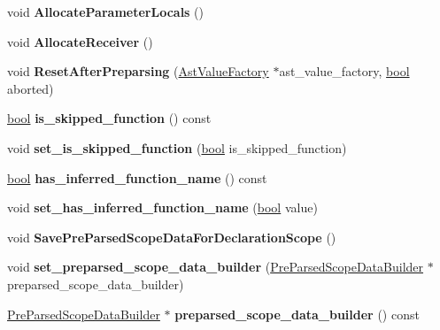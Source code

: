 \begin{DoxyCompactItemize}
void {\bfseries Allocate\+Parameter\+Locals} ()
\item 
\mbox{\label{classv8_1_1internal_1_1DeclarationScope_afe99b27f611544354653c5275d39ed03}} 
void {\bfseries Allocate\+Receiver} ()
\item 
\mbox{\label{classv8_1_1internal_1_1DeclarationScope_a00cec2e44e66ea9705e56ba435012943}} 
void {\bfseries Reset\+After\+Preparsing} (\mbox{\hyperlink{classv8_1_1internal_1_1AstValueFactory}{Ast\+Value\+Factory}} $\ast$ast\+\_\+value\+\_\+factory, \mbox{\hyperlink{classbool}{bool}} aborted)
\item 
\mbox{\label{classv8_1_1internal_1_1DeclarationScope_a82eba118c44639a28e9191483f0071dd}} 
\mbox{\hyperlink{classbool}{bool}} {\bfseries is\+\_\+skipped\+\_\+function} () const
\item 
\mbox{\label{classv8_1_1internal_1_1DeclarationScope_a16f96bb54cb9f5f72100f601dcdd080c}} 
void {\bfseries set\+\_\+is\+\_\+skipped\+\_\+function} (\mbox{\hyperlink{classbool}{bool}} is\+\_\+skipped\+\_\+function)
\item 
\mbox{\label{classv8_1_1internal_1_1DeclarationScope_ac91a3aa6a378fad162d4e095c2bd3f1a}} 
\mbox{\hyperlink{classbool}{bool}} {\bfseries has\+\_\+inferred\+\_\+function\+\_\+name} () const
\item 
\mbox{\label{classv8_1_1internal_1_1DeclarationScope_a79c21bcf9fdc2e24dd41c5f64c7c4274}} 
void {\bfseries set\+\_\+has\+\_\+inferred\+\_\+function\+\_\+name} (\mbox{\hyperlink{classbool}{bool}} value)
\item 
\mbox{\label{classv8_1_1internal_1_1DeclarationScope_aae28ce1bc9c33598ebed34f2f2c4ec4e}} 
void {\bfseries Save\+Pre\+Parsed\+Scope\+Data\+For\+Declaration\+Scope} ()
\item 
\mbox{\label{classv8_1_1internal_1_1DeclarationScope_a3951619cbfaa3da64aafb7964705779f}} 
void {\bfseries set\+\_\+preparsed\+\_\+scope\+\_\+data\+\_\+builder} (\mbox{\hyperlink{classv8_1_1internal_1_1PreParsedScopeDataBuilder}{Pre\+Parsed\+Scope\+Data\+Builder}} $\ast$preparsed\+\_\+scope\+\_\+data\+\_\+builder)
\item 
\mbox{\label{classv8_1_1internal_1_1DeclarationScope_aa5ebace3d5f8c4a095ec668290c494f2}} 
\mbox{\hyperlink{classv8_1_1internal_1_1PreParsedScopeDataBuilder}{Pre\+Parsed\+Scope\+Data\+Builder}} $\ast$ {\bfseries preparsed\+\_\+scope\+\_\+data\+\_\+builder} () const
\end{DoxyCompactItemize}
